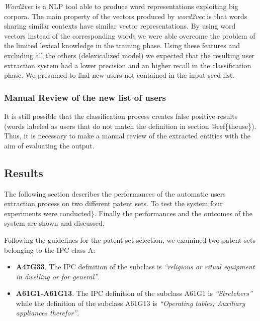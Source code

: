 \documentclass[]{book}
\providecommand{\tightlist}{%
  \setlength{\itemsep}{0pt}\setlength{\parskip}{0pt}}
\theoremstyle{definition}
\theoremstyle{definition}
\theoremstyle{definition}
\theoremstyle{remark}
\begin{document}
\emph{Word2vec} is a NLP tool able to produce word representations
exploiting big corpora. The main property of the vectors produced by
\emph{word2vec} is that words sharing similar contexts have similar
vector representations. By using word vectors instead of the
corresponding words we were able overcome the problem of the limited
lexical knowledge in the training phase. Using these features and
excluding all the others (delexicalized model) we expected that the
resulting user extraction system had a lower precision and an higher
recall in the classification phase. We presumed to find new users not
contained in the input seed list.

\subsubsection*{Manual Review of the new list of
users}\label{manual-review-of-the-new-list-of-users}

It is still possible that the classification process creates false
positive results (words labeled as users that do not match the
definition in section @ref\{theuse\}). Thus, it is necessary to make a
manual review of the extracted entities with the aim of evaluating the
output.

\subsection{Results}\label{results}

The following section describes the performances of the automatic users
extraction process on two different patent sets. To test the system four
experiments were conducted\}. Finally the performances and the outcomes
of the system are shown and discussed.

Following the guidelines for the patent set selection, we examined two
patent sets belonging to the IPC class A:

\begin{itemize}
\tightlist
\item
  \textbf{A47G33}. The IPC definition of the subclass is
  \emph{``religious or ritual equipment in dwelling or for general''}.
\item
  \textbf{A61G1-A61G13}. The IPC definition of the subclass A61G1 is
  \emph{``Stretchers''} while the definition of the subclass A61G13 is
  \emph{``Operating tables; Auxiliary appliances therefor''}.
\end{itemize}
\end{document}
